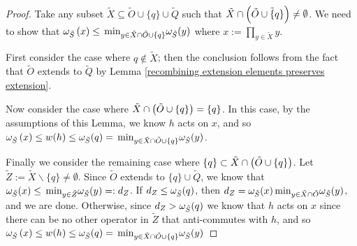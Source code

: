 \documentclass[twocolumn,showpacs,preprintnumbers,amsmath,amssymb,nofootinbib,pra,floatfix]{revtex4-1}
\newcommand{\set}{\tilde}
\begin{document}
\begin{proof}
Take any subset $\set X\subseteq \set O\cup\{q\}\cup\set Q$ such that $\set X\cap\paren{\set O\cup\set \{q\}}\ne\emptyset$.  We need to show that $\om_{\set S}\paren{x} \le \min_{y\in\set X\cap\set O\cup\{q\}}\om_{\set S}(y)$ where $x:=\prod_{y\in \set X} y$.

First consider the case where $q\notin \set X$;  then the conclusion follows from the fact that $\set O$ extends to $\set Q$ by Lemma \ref{recombining extension elements preserves extension}.

Now consider the case where $\set X\cap\paren{\set O\cup\{q\}}=\{q\}$.  In this case, by the assumptions of this Lemma, we know $h$ acts on $x$, and so $\om_{\set S}\paren{x} \le w(h)\le\om_{\set S}(q)=\min_{y\in\set X\cap\set O\cup\{q\}}\om_{\set S}(y)$.

Finally we consider the remaining case where $\{q\}\subset\set X\cap\paren{\set O\cup\{q\}}$. Let $\set Z := \set X\backslash\{q\}\ne\emptyset$.  Since $\set O$ extends to $\{q\}\cup\set Q$, we know that $\om_{\set S}(x)\le \min_{y\in\set Z}\om_{\set S}(y)=:d_Z$.  If $d_Z \le \om_{\set S}(q)$, then $d_Z=\om_{\set S}(x)\min_{y\in\set X\cap\set O}\om_{\set S}(y)$, and we are done.  Otherwise, since $d_Z> \om_{\set S}(q)$ we know that $h$ acts on $x$ since there can be no other operator in $\set Z$ that anti-commutes with $h$, and so $\om_{\set S}\paren{x} \le w(h)\le\om_{\set S}(q)=\min_{y\in\set X\cap\set O\cup\{q\}}\om_{\set S}(y)$
\end{proof}
\end{document}
